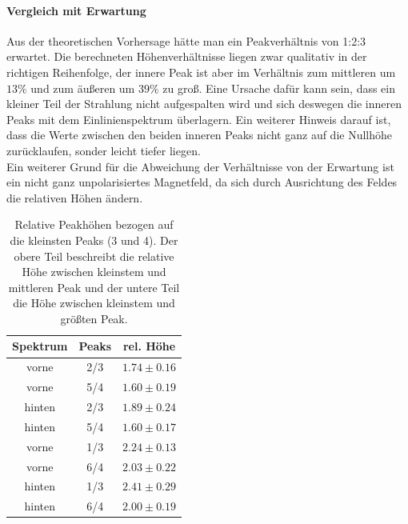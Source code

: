 \documentclass[12pt,a4paper]{article}
\begin{document}
\paragraph{Vergleich mit Erwartung}
Aus der theoretischen Vorhersage hätte man ein Peakverhältnis von 1:2:3 erwartet. Die berechneten Höhenverhältnisse liegen zwar qualitativ in der richtigen Reihenfolge, der innere Peak ist aber im Verhältnis zum mittleren um $13\%$ und zum äußeren um $39\%$ zu groß. Eine Ursache dafür kann sein, dass ein kleiner Teil der Strahlung nicht aufgespalten wird und sich deswegen die inneren Peaks mit dem Einlinienspektrum überlagern. Ein weiterer Hinweis darauf ist, dass die Werte zwischen den beiden inneren Peaks nicht ganz auf die Nullhöhe zurücklaufen, sonder leicht tiefer liegen.\\
Ein weiterer Grund für die Abweichung der Verhältnisse von der Erwartung ist ein nicht ganz unpolarisiertes Magnetfeld, da sich durch Ausrichtung des Feldes die relativen Höhen ändern.

\begin{table}
\centering
\begin{tabular}{|c|c|c|}
\hline 
Spektrum & Peaks & rel. Höhe\\ 
\hline 
vorne & 2/3 & $1.74\pm 0.16$\\ 
\hline 
vorne & 5/4 & $1.60\pm 0.19$\\ 
\hline
hinten & 2/3 & $1.89\pm 0.24$\\ 
\hline
hinten & 5/4 & $1.60\pm 0.17$\\ 
\hline
\hline
vorne & 1/3 & $2.24\pm 0.13$\\ 
\hline
vorne & 6/4 & $2.03\pm 0.22$\\ 
\hline 
hinten & 1/3 & $2.41\pm 0.29$\\ 
\hline
hinten & 6/4 & $2.00\pm 0.19$\\ 
\hline
\end{tabular} 
\caption{Relative Peakhöhen bezogen auf die kleinsten Peaks (3 und 4). Der obere Teil beschreibt die relative Höhe zwischen kleinstem und mittleren Peak und der untere Teil die Höhe zwischen kleinstem und größten Peak.}
\label{tab:Hyper_hohe}
\end{table}
\end{document}
